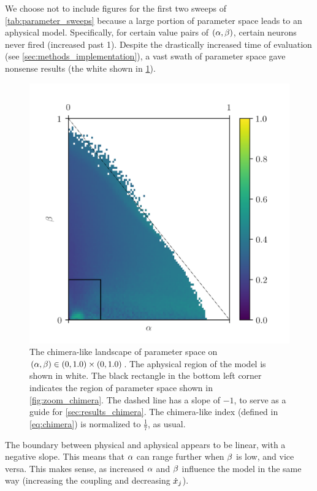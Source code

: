 We choose not to include figures for the first two sweeps of \cref{tab:parameter_sweeps} because a large portion of parameter space leads to an aphysical model.
Specifically, for certain value pairs of $\pqty{\hra, \hrb}$, certain neurons never fired (increased past 1).
Despite the drastically increased time of evaluation (see \cref{sec:methods_implementation}), a vast swath of parameter space gave nonsense results (the white shown in \cref{fig:aphysical_chimera}).
\begin{figure}[ht]
  \centering
  \includegraphics{figure/aphysical_chimera}
  \caption[Chimera-like index landscape]{
    The chimera-like landscape of parameter space on $\pqty{\hra, \hrb} \in \pqty{0, 1.0} \times \pqty{0, 1.0}$.
    The aphysical region of the model is shown in white.
    The black rectangle in the bottom left corner indicates the region of parameter space shown in \cref{fig:zoom_chimera}.
    The dashed line has a slope of $-1$, to serve as a guide for \cref{sec:results_chimera}.
    The chimera-like index (defined in \cref{eq:chimera}) is normalized to $\frac{1}{7}$, as usual.
  }
  \label{fig:aphysical_chimera}
\end{figure}
The boundary between physical and aphysical appears to be linear, with a negative slope.
This means that $\alpha$ can range further when $\beta$ is low,
and vice versa.
This makes sense, as increased $\alpha$ and $\beta$ influence the model in the same way (increasing the coupling and decreasing $\dot{x}_{j}$).

